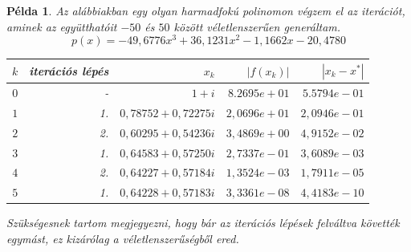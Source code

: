 \documentclass[a4paper,12pt]{report}
\newtheorem{Pl}[Tet]{Példa}
\begin{document}
            \begin{Pl}
				Az alábbiakban egy olyan harmadfokú polinomon végzem el az iterációt, aminek az együtthatóit $-50$ és $50$ között véletlenszerűen generáltam.
				\[p(x)=-49,\!6776x^3+36,\!1231x^2-1,\!1662x-20,\!4780\]
				\begin{center}
					\begin{tabular}{|r|r|r|r|r|}
						\hline
						$k$ &   iterációs lépés &   $x_k$                   &   $|f(x_k)|$      &   $|x_k-x^*|$  \\ \hline
						$0$ &   -               &   $1+i$                   &   $8.2695e+01$    &   $5.5794e-01$ \\ 
						$1$ &   1.              &   $0,\!78752 + 0,\!72275i$    &   $2,\!0696e+01$    &   $2,\!0946e-01$ \\ 
						$2$ &   2.              &   $0,\!60295 + 0,\!54236i$    &   $3,\!4869e+00$    &   $4,\!9152e-02$ \\ 
						$3$ &   1.              &   $0,\!64583 + 0,\!57250i$    &   $2,\!7337e-01$    &   $3,\!6089e-03$ \\ 
						$4$ &   2.              &   $0,\!64227 + 0,\!57184i$    &   $1,\!3524e-03$    &   $1,\!7911e-05$ \\ 
						$5$ &   1.              &   $0,\!64228 + 0,\!57183i$    &   $3,\!3361e-08$    &   $4,\!4183e-10$ \\
						\hline
					\end{tabular}
				\end{center}
                Szükségesnek tartom megjegyezni, hogy bár az iterációs lépések felváltva követték egymást, ez kizárólag a véletlenszerűségből ered.
			\end{Pl}
\end{document}
